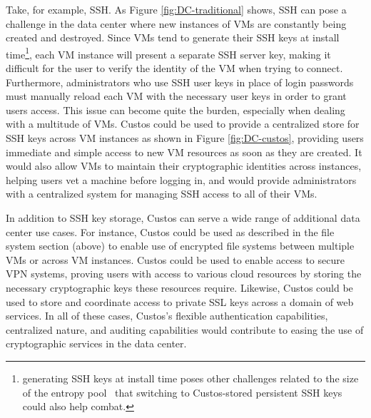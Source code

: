 Take, for example, SSH. As Figure \ref{fig:DC-traditional} shows, SSH
can pose a challenge in the data center where new instances of VMs are
constantly being created and destroyed. Since VMs tend to generate
their SSH keys at install time\footnote{generating SSH keys at install
  time poses other challenges related to the size of the entropy
  pool~\cite{Heninger2012} that switching to Custos-stored persistent
  SSH keys could also help combat.}, each VM instance will present a
separate SSH server key, making it difficult for the user to verify
the identity of the VM when trying to connect. Furthermore,
administrators who use SSH user keys in place of login passwords must
manually reload each VM with the necessary user keys in order to grant
users access. This issue can become quite the burden, especially when
dealing with a multitude of VMs. Custos could be used to provide a
centralized store for SSH keys across VM instances as shown in Figure
\ref{fig:DC-custos}, providing users immediate and simple access to
new VM resources as soon as they are created. It would also allow VMs
to maintain their cryptographic identities across instances, helping
users vet a machine before logging in, and would provide
administrators with a centralized system for managing SSH access to
all of their VMs.

In addition to SSH key storage, Custos can serve a wide range of
additional data center use cases. For instance, Custos could be used
as described in the file system section (above) to enable use of
encrypted file systems between multiple VMs or across VM
instances. Custos could be used to enable access to secure VPN
systems, proving users with access to various cloud resources by
storing the necessary cryptographic keys these resources
require. Likewise, Custos could be used to store and coordinate access
to private SSL keys across a domain of web services. In all of these
cases, Custos's flexible authentication capabilities, centralized
nature, and auditing capabilities would contribute to easing the use
of cryptographic services in the data center.

